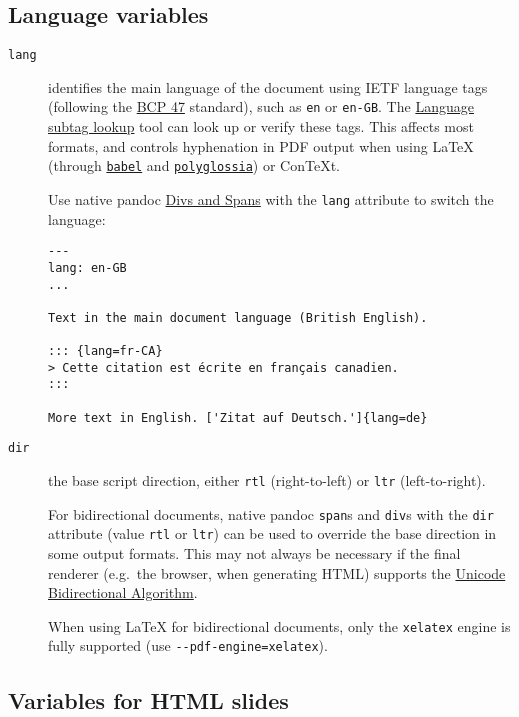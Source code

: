 \hypertarget{language-variables}{%
\subsection{Language variables}\label{language-variables}}

\begin{description}
\item[\texttt{lang}]
identifies the main language of the document using IETF language tags
(following the \href{https://tools.ietf.org/html/bcp47}{BCP 47}
standard), such as \texttt{en} or \texttt{en-GB}. The
\href{https://r12a.github.io/app-subtags/}{Language subtag lookup} tool
can look up or verify these tags. This affects most formats, and
controls hyphenation in PDF output when using LaTeX (through
\href{https://ctan.org/pkg/babel}{\texttt{babel}} and
\href{https://ctan.org/pkg/polyglossia}{\texttt{polyglossia}}) or
ConTeXt.

Use native pandoc \protect\hyperlink{divs-and-spans}{Divs and Spans}
with the \texttt{lang} attribute to switch the language:

\begin{verbatim}
---
lang: en-GB
...

Text in the main document language (British English).

::: {lang=fr-CA}
> Cette citation est écrite en français canadien.
:::

More text in English. ['Zitat auf Deutsch.']{lang=de}
\end{verbatim}
\item[\texttt{dir}]
the base script direction, either \texttt{rtl} (right-to-left) or
\texttt{ltr} (left-to-right).

For bidirectional documents, native pandoc \texttt{span}s and
\texttt{div}s with the \texttt{dir} attribute (value \texttt{rtl} or
\texttt{ltr}) can be used to override the base direction in some output
formats. This may not always be necessary if the final renderer
(e.g.~the browser, when generating HTML) supports the
\href{http://www.w3.org/International/articles/inline-bidi-markup/uba-basics}{Unicode
Bidirectional Algorithm}.

When using LaTeX for bidirectional documents, only the \texttt{xelatex}
engine is fully supported (use \texttt{-\/-pdf-engine=xelatex}).
\end{description}

\hypertarget{variables-for-html-slides}{%
\subsection{Variables for HTML slides}\label{variables-for-html-slides}}

